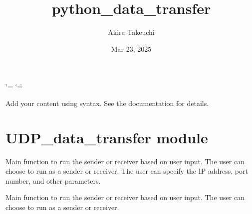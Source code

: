 \documentclass[letterpaper,10pt,english]{sphinxmanual}
\title{python\_data\_transfer}
\date{Mar 23, 2025}
\author{Akira Takeuchi}
\begin{document}
\ifdefined\shorthandoff
  \ifnum\catcode`\=\string=\active\shorthandoff{=}\fi
  \ifnum\catcode`\"=\active{}\fi
\fi

\pagestyle{empty}
\sphinxmaketitle
\pagestyle{plain}
\sphinxtableofcontents
\pagestyle{normal}
\label{\detokenize{index::doc}}


\sphinxAtStartPar
Add your content using  syntax. See the
documentation for details.

\sphinxstepscope


\chapter{UDP\_data\_transfer module}
\label{\detokenize{UDP_data_transfer:module-UDP_data_transfer}}\label{\detokenize{UDP_data_transfer:udp-data-transfer-module}}\label{\detokenize{UDP_data_transfer::doc}}
\sphinxAtStartPar
Main function to run the sender or receiver based on user input.
The user can choose to run as a sender or receiver.
The user can specify the IP address, port number, and other parameters.

\begin{fulllineitems}
\label{\detokenize{UDP_data_transfer:UDP_data_transfer.main}}
\pysigstartsignatures
\pysiglinewithargsret
{}
{}
{}
\pysigstopsignatures
\sphinxAtStartPar
Main function to run the sender or receiver based on user input.
The user can choose to run as a sender or receiver.

\end{fulllineitems}



\renewcommand{\indexname}{Python Module Index}
\begin{sphinxtheindex}
\let\bigletter\sphinxstyleindexlettergroup
\bigletter{u}
\item\relax{}
\end{sphinxtheindex}

\renewcommand{\indexname}{Index}
\printindex
\end{document}
